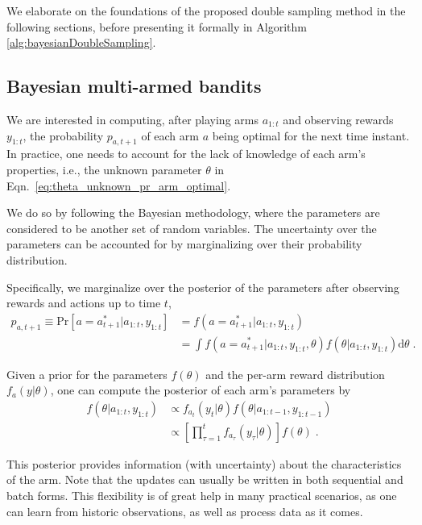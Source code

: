 \documentclass{article}
\newcommand{\ie}{i.e., }
\begin{document}
We elaborate on the foundations of the proposed double sampling method in the following sections, before presenting it formally in Algorithm \autoref{alg:bayesianDoubleSampling}.

\subsection{Bayesian multi-armed bandits}
\label{ssec:bayesian_multi_armed_bandit}

We are interested in computing, after playing arms $a_{1:t}$ and observing rewards $y_{1:t}$, the probability $p_{a,t+1}$ of each arm $a$ being optimal for the next time instant. In practice, one needs to account for the lack of knowledge of each arm's properties, \ie the unknown parameter $\theta$ in Eqn.~\eqref{eq:theta_unknown_pr_arm_optimal}.

We do so by following the Bayesian methodology, where the parameters are considered to be another set of random variables. The uncertainty over the parameters can be accounted for by marginalizing over their probability distribution.

Specifically, we marginalize over the posterior of the parameters after observing rewards and actions up to time $t$,
\begin{equation}
\begin{split}
p_{a,t+1} \equiv \mathrm{Pr}\left[a=a_{t+1}^* \big| a_{1:t}, y_{1:t}\right] &= f(a=a^*_{t+1}|a_{1:t}, y_{1:t}) \\
&=\int f(a=a^*_{t+1}|a_{1:t}, y_{1:t}, \theta) f(\theta|a_{1:t}, y_{1:t}) \mathrm{d}\theta \;.
\end{split}
\label{eq:pr_arm_optimal_bayes}
\end{equation}

Given a prior for the parameters $f(\theta)$ and the per-arm reward distribution $f_{a}(y|\theta)$, one can compute the posterior of each arm's parameters by
\begin{equation}
\begin{split}
f(\theta|a_{1:t}, y_{1:t}) &\propto f_{a_t}(y_t | \theta)f(\theta | a_{1:t-1}, y_{1:t-1}) \\
& \propto \left[\prod_{\tau=1}^t f_{a_{\tau}}(y_{\tau}|\theta)\right] f(\theta) \; .
\end{split}
\label{eq:seq_param_posterior}
\end{equation}

This posterior provides information (with uncertainty) about the characteristics of the arm. Note that the updates can usually be written in both sequential and batch forms. This flexibility is of great help in many practical scenarios, as one can learn from historic observations, as well as process data as it comes.
\end{document}
